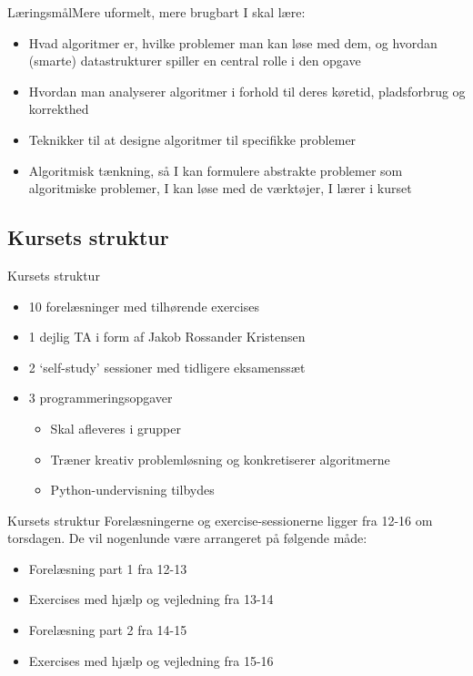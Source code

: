 \documentclass[aspectratio=1610]{beamer}
\begin{document}
\begin{frame}{Læringsmål}{Mere uformelt, mere brugbart}
    I skal lære:
    \pause
    \begin{itemize}
        \item Hvad algoritmer er, hvilke problemer man kan løse med dem, og
            hvordan (smarte) datastrukturer spiller en central rolle i den
            opgave
            \pause
        \item Hvordan man analyserer algoritmer i forhold til deres køretid,
            pladsforbrug og korrekthed
            \pause
        \item Teknikker til at designe algoritmer til specifikke problemer
            \pause
        \item Algoritmisk tænkning, så I kan formulere abstrakte problemer som
            algoritmiske problemer, I kan løse med de værktøjer, I lærer i
            kurset
    \end{itemize}
\end{frame}



\subsection[Struktur]{Kursets struktur}

\begin{frame}{Kursets struktur}
   \begin{itemize}
       \item 10 forelæsninger med tilhørende exercises \pause
       \item 1 dejlig TA i form af Jakob Rossander Kristensen \pause
       \item 2 `self-study' sessioner med tidligere eksamenssæt \pause
       \item 3 programmeringsopgaver \pause
           \begin{itemize}
               \item Skal afleveres i grupper
               \item Træner kreativ problemløsning og konkretiserer algoritmerne
               \item Python-undervisning tilbydes
           \end{itemize}
   \end{itemize} 
\end{frame}

\begin{frame}{Kursets struktur}
    Forelæsningerne og exercise-sessionerne ligger fra 12-16 om torsdagen. De
    vil nogenlunde være arrangeret på følgende måde:

    \pause

    \begin{itemize}
        \item Forelæsning part 1 fra 12-13
        \item Exercises med hjælp og vejledning fra 13-14
        \item Forelæsning part 2 fra 14-15
        \item Exercises med hjælp og vejledning fra 15-16
    \end{itemize}

\end{frame}
\end{document}
